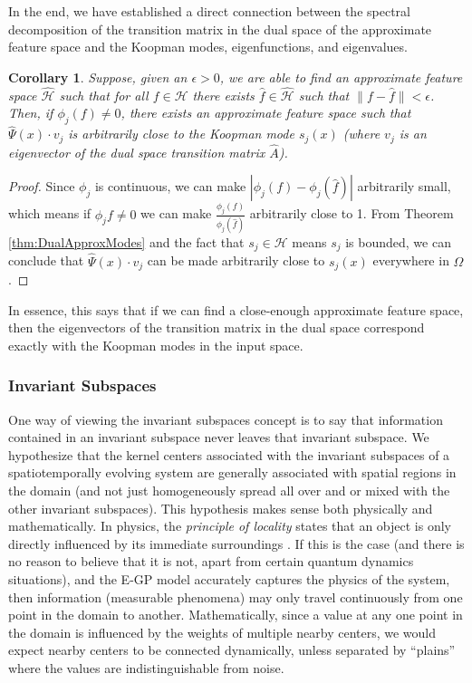 \documentclass[letterpaper,12pt,peerreviewca,draftcls]{IEEEtran}
\newtheorem{corollary}{Corollary}
\newcommand{\e}{\epsilon}
\newcommand{\fspace}{\mathcal{H}}
\newcommand{\dom}{\Omega}
\newcommand{\fspaceApprox}{\widehat{\fspace}}
\newcommand{\fspaceEl}{f}
\newcommand{\fspaceApproxEl}{\widehat{\fspaceEl}}
\newcommand{\obsMatRow}{\widehat{\Psi}}
\newcommand{\dualop}{A}
\newcommand{\dualopApprox}{\widehat{\dualop}}
\begin{document}
In the end, we have established a direct connection between the spectral decomposition of the transition matrix in the dual space of the approximate feature space and the Koopman modes, eigenfunctions, and eigenvalues. 
\begin{corollary}\label{cor:ModesApprox}
	Suppose, given an $\e>0$, we are able to find an approximate feature space $\fspaceApprox$ such that for all $\fspaceEl\in\fspace$ there exists $\fspaceApproxEl\in\fspaceApprox$ such that $\|\fspaceEl - \fspaceApproxEl\| < \e$. Then, if $\phi_j(\fspaceEl) \neq 0$, there exists an approximate feature space such that $\obsMatRow(x) \cdot v_j$ is arbitrarily close to the Koopman mode $s_j(x)$ (where $v_j$ is an eigenvector of the dual space transition matrix $\dualopApprox$).
\end{corollary}
\begin{proof}
	Since $\phi_j$ is continuous, we can make $|\phi_j(\fspaceEl) - \phi_j(\fspaceApproxEl)|$ arbitrarily small, which means if $\phi_j{\fspaceEl} \neq 0$ we can make $\frac{\phi_j(\fspaceEl)}{\phi_j(\fspaceApproxEl)}$ arbitrarily close to 1. From Theorem \ref{thm:DualApproxModes} and the fact that $s_j\in\fspace$ means $s_j$ is bounded, we can conclude that $\obsMatRow(x) \cdot v_j$ can be made arbitrarily close to $s_j(x)$ everywhere in $\dom$. %
	
\end{proof}
In essence, this says that if we can find a close-enough approximate feature space, then the eigenvectors of the transition matrix in the dual space correspond exactly with the Koopman modes in the input space.




\subsubsection{Invariant Subspaces}

One way of viewing the invariant subspaces concept is to say that information contained in an invariant subspace never leaves that invariant subspace. We hypothesize that the kernel centers associated with the invariant subspaces of a spatiotemporally evolving system are generally associated with spatial regions in the domain (and not just homogeneously spread all over and or mixed with the other invariant subspaces). This hypothesis makes sense both physically and mathematically. In physics, the \emph{principle of locality} states that an object is only directly influenced by its immediate surroundings \cite{berkovitz2007action}. If this is the case (and there is no reason to believe that it is not, apart from certain quantum dynamics situations), and the E-GP model accurately captures the physics of the system, then information (measurable phenomena) may only travel continuously from one point in the domain to another. Mathematically, since a value at any one point in the domain is influenced by the weights of multiple nearby centers, we would expect nearby centers to be connected dynamically, unless separated by ``plains'' where the values are indistinguishable from noise.
\end{document}
